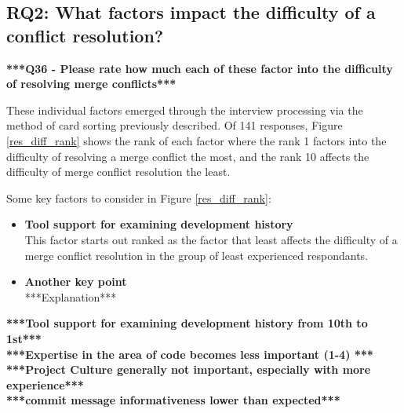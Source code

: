 \subsection{RQ2: What factors impact the difficulty of a conflict resolution?}
\textbf{***Q36 - Please rate how much each of these factor into the difficulty of resolving merge conflicts***}


These individual factors emerged through the interview processing via the method of card sorting previously described. Of 141 responses, Figure \ref{res_diff_rank} shows the rank of each factor where the rank 1 factors into the difficulty of resolving a merge conflict the most, and the rank 10 affects the difficulty of merge conflict resolution the least.

Some key factors to consider in Figure \ref{res_diff_rank}:
\begin{itemize}
\item \textbf{Tool support for examining development history}\\
This factor starts out ranked as the factor that least affects the difficulty of a merge conflict resolution in the group of least experienced respondants.
\item \textbf{Another key point}\\
***Explanation*** 
\end{itemize}

\textbf{***Tool support for examining development history from 10th to 1st***}\\
\textbf{***Expertise in the area of code becomes less important (1-4) ***}\\
\textbf{***Project Culture generally not important, especially with more experience***}\\
\textbf{***commit message informativeness lower than expected***}\\

